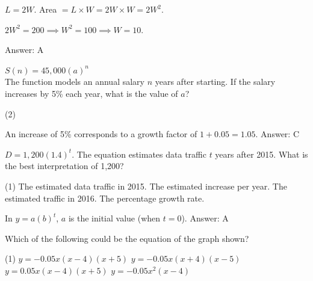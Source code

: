 \documentclass[11pt,paper=a4,answers]{exam}
\begin{document}
\begin{questions}
\begin{solution}
$L = 2W$. Area $= L \times W = 2W \times W = 2W^2$.
\vspace{5pt}
\begin{center}
$2W^2 = 200 \implies W^2 = 100 \implies W = 10$.
\end{center}
\vspace{5pt}
Answer: \colorbox{yellow!100}{A}
\end{solution}

\vspace{1cm}

\question
$S(n) = 45,000(a)^n$ \\
The function models an annual salary $n$ years after starting. If the salary increases by 5\% each year, what is the value of $a$?
\begin{tasks}(2)
       
\end{tasks}

\begin{solution}
An increase of 5\% corresponds to a growth factor of $1 + 0.05 = 1.05$.
\vspace{5pt}
Answer: \colorbox{yellow!100}{C}
\end{solution}

\vspace{1cm}

\question
$D = 1,200(1.4)^t$. The equation estimates data traffic $t$ years after 2015. What is the best interpretation of 1,200?
\begin{tasks}(1)
    \task The estimated data traffic in 2015.
    \task The estimated increase per year.
    \task The estimated traffic in 2016.
    \task The percentage growth rate.
\end{tasks}

\begin{solution}
In $y=a(b)^t$, $a$ is the initial value (when $t=0$).
\vspace{5pt}
Answer: \colorbox{yellow!100}{A}
\end{solution}

\vspace{1cm}

\question
\begin{center}
\end{center}
Which of the following could be the equation of the graph shown?
\begin{tasks}(1)
    \task $y = -0.05x(x-4)(x+5)$
    \task $y = -0.05x(x+4)(x-5)$
    \task $y = 0.05x(x-4)(x+5)$
    \task $y = -0.05x^2(x-4)$
\end{tasks}


\end{questions}
\end{document}
